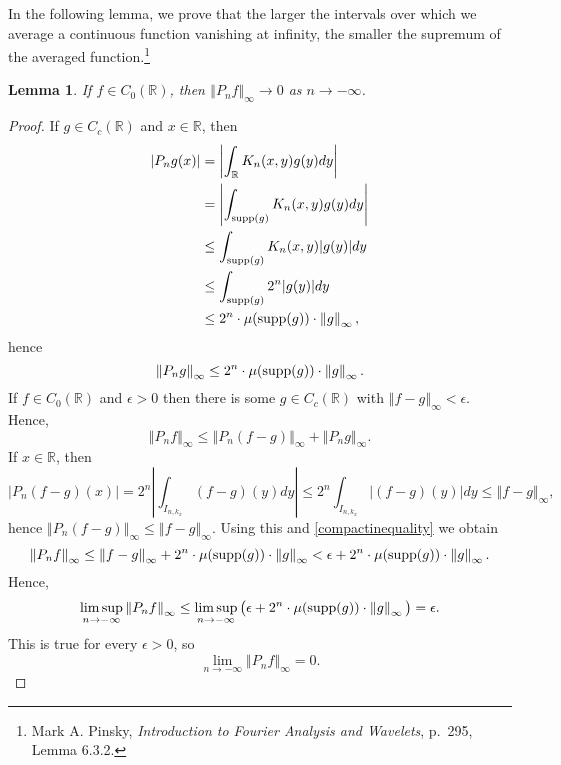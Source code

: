 \documentclass{article}
\newcommand{\supp}{\ensuremath\mathrm{supp}}
\newcommand{\norm}[1]{\left\Vert #1 \right\Vert}
\newtheorem{lemma}[theorem]{Lemma}
\theoremstyle{definition}
\begin{document}
In the following lemma, we prove that the larger the intervals over which we average a continuous function  vanishing at infinity,
the smaller the supremum of the averaged function.\footnote{Mark A. Pinsky, {\em Introduction to
Fourier Analysis and Wavelets}, p.~295, Lemma 6.3.2.}

\begin{lemma} If $f \in C_0(\mathbb{R})$, then $\norm{P_n f}_\infty \to 0$ as $n \to -\infty$.
\label{negativeuniform}
\end{lemma}
\begin{proof}
If $g \in C_c(\mathbb{R})$ and
$x \in \mathbb{R}$, then
\begin{align*}
|P_n g(x)| &= \left| \int_{\mathbb{R}} K_n(x,y)g(y)dy \right|\\
&=\left| \int_{\supp(g)} K_n(x,y) g(y) dy \right|\\
&\leq \int_{\supp(g)} K_n(x,y) |g(y)| dy\\
&\leq \int_{\supp(g)} 2^n |g(y)| dy\\
&\leq 2^n\cdot  \mu(\supp(g)) \cdot \norm{g}_\infty,
\end{align*}
hence
\begin{equation}
\norm{P_n g}_\infty \leq 2^n\cdot  \mu(\supp(g)) \cdot \norm{g}_\infty.
\label{compactinequality}
\end{equation}
If $f \in C_0(\mathbb{R})$ and $\epsilon>0$ then there is some $g \in C_c(\mathbb{R})$ with $\norm{f-g}_\infty < \epsilon$.
Hence,
\[
\norm{P_nf}_\infty \leq \norm{P_n(f-g)}_\infty + \norm{P_n g}_\infty.
\]
If $x \in \mathbb{R}$,  then
\[
|P_n (f-g)(x)| =2^n \left| \int_{I_{n,k_x}} (f-g)(y) dy \right| \leq 2^n \int_{I_{n,k_x}} |(f-g)(y)| dy \leq \norm{f-g}_\infty,
\]
hence $\norm{P_n(f-g)}_\infty \leq \norm{f-g}_\infty$. Using this and \eqref{compactinequality} we obtain
\[
\norm{P_nf}_\infty \leq \norm{f-g}_\infty + 2^n\cdot  \mu(\supp(g)) \cdot \norm{g}_\infty < \epsilon+2^n\cdot  \mu(\supp(g)) \cdot \norm{g}_\infty.
\]
Hence,
\[
\limsup_{n \to -\infty} \norm{P_nf}_\infty \leq  \limsup_{n \to -\infty} \big(\epsilon+2^n\cdot  \mu(\supp(g)) \cdot \norm{g}_\infty \big)
=\epsilon.
\]
This is true for every $\epsilon>0$, so
\[
\lim_{n \to -\infty} \norm{P_n f}_\infty = 0.
\]
\end{proof}
\end{document}
